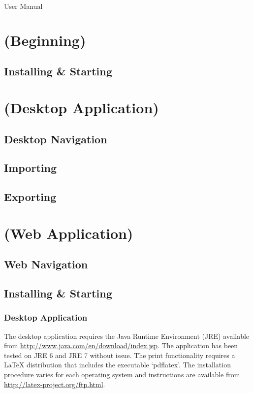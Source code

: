 User Manual

\tableofcontents

\chapter{(Beginning)}
\section{Installing & Starting}

\chapter{(Desktop Application)}
\section{Desktop Navigation}
\section{Importing}
\section{Exporting}

\chapter{(Web Application)}
\section{Web Navigation}

\section{Installing & Starting}
\subsection{Desktop Application}

The desktop application requires the Java Runtime Environment (JRE) available from \url{http://www.java.com/en/download/index.jsp}. The application has been tested on JRE 6 and JRE 7 without issue. The print functionality requires a LaTeX distribution that includes the executable `pdflatex'. The installation procedure varies for each operating system and instructions are available from \url{http://latex-project.org/ftp.html}.

